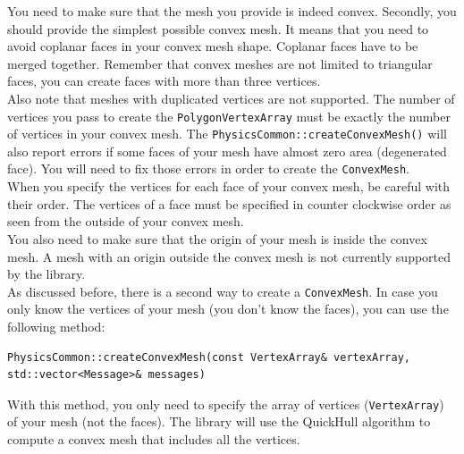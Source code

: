 \documentclass[a4paper,12pt]{article}
\begin{document}
    You need to make sure that the mesh you provide is indeed convex. Secondly, you should provide the simplest possible convex mesh. It means
    that you need to avoid coplanar faces in your convex mesh shape. Coplanar faces have to be merged together. Remember that convex meshes are
    not limited to triangular faces, you can create faces with more than three vertices. \\

    Also note that meshes with duplicated vertices are not supported. The number of vertices you pass to create the \texttt{PolygonVertexArray} must
    be exactly the number of vertices in your convex mesh. The \texttt{PhysicsCommon::createConvexMesh()} will also report errors if some faces of your
    mesh have almost zero area (degenerated face). You will need to fix those errors in order to create the \texttt{ConvexMesh}. \\

    When you specify the vertices for each face of your convex mesh, be careful with their order. The vertices of a face must be specified in
    counter clockwise order as seen from the outside of your convex mesh. \\

    You also need to make sure that the origin of your mesh is inside the convex mesh. A mesh with an origin outside the
    convex mesh is not currently supported by the library. \\

    As discussed before, there is a second way to create a \texttt{ConvexMesh}. In case you only know the vertices of your
    mesh (you don't know the faces), you can use the following method: \\

    \begin{lstlisting}
PhysicsCommon::createConvexMesh(const VertexArray& vertexArray, std::vector<Message>& messages)
    \end{lstlisting}

    With this method, you only need to specify the array of vertices (\texttt{VertexArray}) of your mesh (not the faces). The library will use the
    QuickHull algorithm to compute a convex mesh that includes all the vertices. \\
\end{document}
